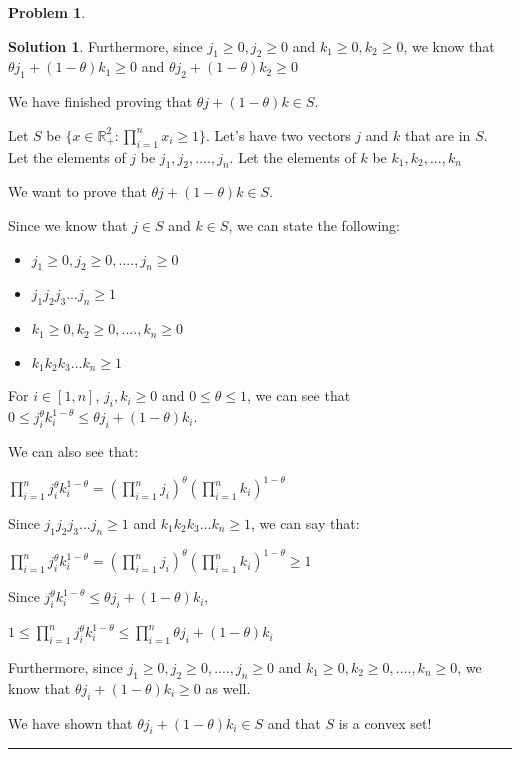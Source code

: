 \documentclass{article}
\theoremstyle{definition}
\newtheorem{problem}{Problem}
\def\fline{\rule{0.75\linewidth}{0.5pt}}
\newcommand{\finishline}{\begin{center}\fline\end{center}}
\newtheorem*{solution*}{Solution}
\newenvironment{solution}{\begin{solution*}}{{\finishline} \end{solution*}}
\begin{document}
\begin{problem}
\begin{solution}
    Furthermore, since $j_1 \geq 0, j_2 \geq 0$ and $k_1 \geq 0, k_2 \geq 0$, we know that $\theta j_1 + (1 - \theta)k_1 \geq 0$ and $\theta j_2 + (1 - \theta)k_2 \geq 0$

    We have finished proving that $\theta j + (1 - \theta)k \in S$. 
    
    Let $S$ be $\{x \in \mathbb{R}^2_+ : \prod_{i=1}^{n} x_i \geq 1\}$. Let's have two vectors  $j$ and $k$ that are in $S$. Let the elements of $j$ be $j_1, j_2, ...., j_n$. Let the elements of $k$ be $k_1, k_2, ..., k_n$

        We want to prove that $\theta j + (1 - \theta)k \in S$. 

        Since we know that $j \in S$ and $k \in S$, we can state the following:
        \begin{itemize}
            \item $j_1 \geq 0, j_2 \geq 0, ...., j_n \geq 0$
            \item $j_1 j_2 j_3 ... j_n \geq 1$
            \item $k_1 \geq 0, k_2 \geq 0, ...., k_n \geq 0$
            \item $k_1 k_2 k_3 ... k_n \geq 1$
        \end{itemize}

        For $i \in [1, n]$, $j_i, k_i \geq 0$ and $0 \leq \theta \leq 1$, we can see that $0 \leq j_i^{\theta} k_i^{1 - \theta} \leq \theta j_i + (1 - \theta)k_i$. 

        We can also see that: \newline 
        
        $\prod_{i=1}^{n} j_i^{\theta} k_i^{1 - \theta} =  (\prod_{i=1}^{n} j_i)^{\theta} (\prod_{i=1}^{n} k_i)^{1 - \theta}$

        Since $j_1 j_2 j_3 ... j_n \geq 1$ and $k_1 k_2 k_3 ... k_n \geq 1$, we can say that: \newline 
        
        $\prod_{i=1}^{n} j_i^{\theta} k_i^{1 - \theta} =  (\prod_{i=1}^{n} j_i)^{\theta} (\prod_{i=1}^{n} k_i)^{1 - \theta} \geq 1$

        Since $j_i^{\theta} k_i^{1 - \theta} \leq \theta j_i + (1 - \theta)k_i$, \newline
        
        $1 \leq \prod_{i=1}^{n} j_i^{\theta} k_i^{1 - \theta} \leq   \prod_{i=1}^{n} \theta j_i + (1 - \theta)k_i$

        Furthermore, since $j_1 \geq 0, j_2 \geq 0, ...., j_n \geq 0$ and $k_1 \geq 0, k_2 \geq 0, ...., k_n \geq 0$, we know that $\theta j_i + (1 - \theta)k_i \geq 0$ as well. 

        We have shown that $\theta j_i + (1 - \theta)k_i \in S$ and that $S$ is a convex set!
        
    \end{solution}
\end{problem}
\end{document}
